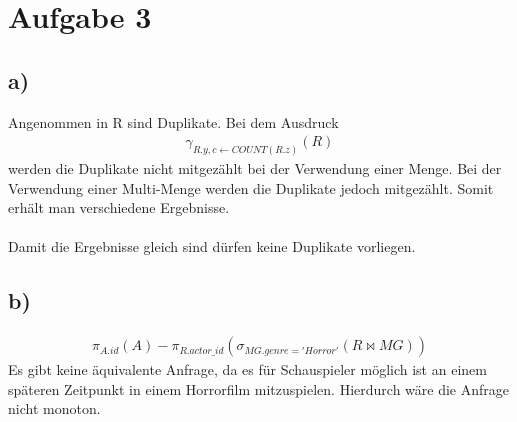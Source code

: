 \pagebreak
\section*{Aufgabe 3}
\subsection*{a)}
Angenommen in R sind Duplikate. Bei dem Ausdruck
\begin{align*}
  \gamma _{ R.y,c\leftarrow COUNT(R.z) } (R) 
\end{align*}
werden die Duplikate nicht mitgezählt bei der Verwendung einer Menge. Bei der Verwendung einer Multi-Menge werden die Duplikate jedoch mitgezählt. Somit erhält man verschiedene Ergebnisse. \\\\
Damit die Ergebnisse gleich sind dürfen keine Duplikate vorliegen.
\subsection*{b)}
\begin{align*}
  \pi _{ A.id } (A) - \pi _{ R.actor\_id } (\sigma _{ MG.genre = 'Horror' } (R\Join MG))
\end{align*}
Es gibt keine äquivalente Anfrage, da es für Schauspieler möglich ist an einem späteren Zeitpunkt in einem Horrorfilm mitzuspielen. Hierdurch wäre die Anfrage nicht monoton.